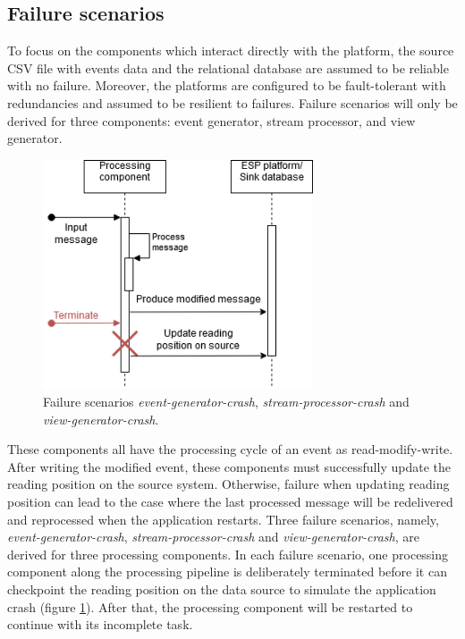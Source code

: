  
\subsection{Failure scenarios}  \label{subsection:failurescenarios}
To focus on the components which interact directly with the platform, the source CSV file with events data and the relational database are assumed to be reliable with no failure. Moreover, the platforms are configured to be fault-tolerant with redundancies and assumed to be resilient to failures.  Failure scenarios will only be derived for three components: event generator, stream processor, and view generator.

\begin{figure}[h]
	\centering
	\includegraphics[width=8cm]{images/reading-position-fail.png}
	\caption{Failure scenarios \emph{event-generator-crash}, \emph{stream-processor-crash} and \emph{view-generator-crash}.}
	\label{fig:scenarioreadingposition}
\end{figure}

These components all have the processing cycle of an event as read-modify-write. After writing the modified event, these components must successfully update the reading position on the source system. Otherwise, failure when updating reading position can lead to the case where the last processed message will be redelivered and reprocessed when the application restarts. Three failure scenarios, namely, \emph{event-generator-crash}, \emph{stream-processor-crash} and \emph{view-generator-crash}, are derived for three processing components. In each failure scenario, one processing component along the processing pipeline is deliberately terminated before it can checkpoint the reading position on the data source to simulate the application crash (figure \ref{fig:scenarioreadingposition}). After that, the processing component will be restarted to continue with its incomplete task.



